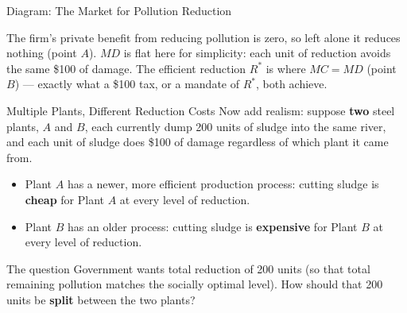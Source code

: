 \documentclass[11pt,aspectratio=169]{beamer}
\begin{document}
\begin{frame}{Diagram: The Market for Pollution Reduction}
  \begin{center}
  \end{center}
  \footnotesize The firm's private benefit from reducing pollution is zero, so left alone it reduces nothing (point $A$). $MD$ is flat here for simplicity: each unit of reduction avoids the same \$100 of damage. The efficient reduction $R^*$ is where $MC=MD$ (point $B$) --- exactly what a \$100 tax, or a mandate of $R^*$, both achieve.
\end{frame}

\begin{frame}{Multiple Plants, Different Reduction Costs}
  Now add realism: suppose \textbf{two} steel plants, $A$ and $B$, each currently dump 200 units of sludge into the same river, and each unit of sludge does \$100 of damage regardless of which plant it came from.
  \begin{itemize}
    \item Plant $A$ has a newer, more efficient production process: cutting sludge is \textbf{cheap} for Plant $A$ at every level of reduction.
    \item Plant $B$ has an older process: cutting sludge is \textbf{expensive} for Plant $B$ at every level of reduction.
  \end{itemize}
  \vspace{0.4em}
  \begin{alertblock}{The question}
    Government wants total reduction of 200 units (so that total remaining pollution matches the socially optimal level). How should that 200 units be \textbf{split} between the two plants?
  \end{alertblock}
\end{frame}
\end{document}
